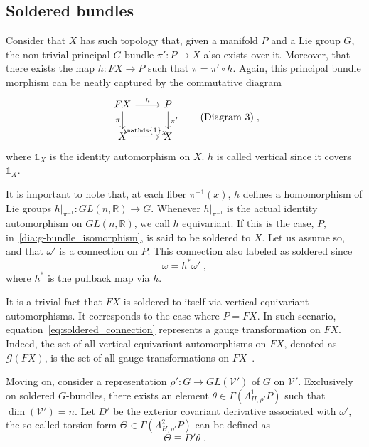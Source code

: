 \documentclass[../../main.tex]{subfiles}
\begin{document}
\subsection{Soldered bundles}\label{ssec:soldered_bundles}

Consider that $X$ has such topology that, given a manifold $P$ and a Lie group $G$, the non-trivial principal $G$-bundle $\pi': P \rightarrow X$ also exists over it. Moreover, that there exists the map $h: FX \rightarrow P$ such that $\pi=\pi'\circ h$. Again, this principal bundle morphism can be neatly captured by the commutative diagram
\begin{equation}
  \label{dia:g-bundle_isomorphism}
  \begin{tikzcd}
    FX
    \arrow[r,"h"]
    \arrow[d,"\pi" left]
    &
    P
    \arrow[d, "\pi'" ]
    \\
    X
    \arrow[r, "\mathds{1}_X"]
    &
    X
  \end{tikzcd} \tag{Diagram 3} \;,
\end{equation}
where $\mathds{1}_X$ is the identity automorphism on $X$. $h$ is called vertical since it covers $\mathds{1}_X$.

It is important to note that, at each fiber $\pi^{-1}(x)$, $h$ defines a homomorphism of Lie groups $h|_{\pi^{-1}}:GL\left(n,\mathbb{R}\right)\rightarrow G$. Whenever $h|_{\pi^{-1}}$ is the actual identity automorphism on $GL\left(n,\mathbb{R}\right)$, we call $h$ equivariant. If this is the case, $P$, in~\ref{dia:g-bundle_isomorphism}, is said to be soldered to $X$. Let us assume so, and that $\omega'$ is a connection on $P$. This connection also labeled as soldered since
\begin{equation}
  \label{eq:soldered_connection}
  \omega = h^* \omega' \;,
\end{equation}
where $h^*$ is the pullback map via $h$.

It is a trivial fact that $FX$ is soldered to itself via vertical equivariant automorphisms. It corresponds to the case where $P=FX$. In such scenario, equation~\eqref{eq:soldered_connection} represents a gauge transformation on $FX$. Indeed, the set of all vertical equivariant automorphisms on $FX$, denoted as $\mathcal{G}\left(FX\right)$, is the set of all gauge transformations on $FX$~\cite{bleecker1981, rudolph2017}.

Moving on, consider a representation $\rho': G\rightarrow GL\left(\mathcal{V}'\right)$ of $G$ on $\mathcal{V}'$. Exclusively on soldered $G$-bundles, there exists an element $\theta \in \Gamma \left(\Lambda^1_{H,\rho'}P\right)$ such that $\dim \left(\mathcal{V}'\right)=n$. Let $D'$ be the exterior covariant derivative associated with $\omega'$, the so-called torsion form $\Theta \in \Gamma \left(\Lambda^2_{H,\rho'}P\right)$ can be defined as
\begin{equation}
  \label{eq:torsion_form}
  \Theta\equiv D'\theta \;.
\end{equation}
\end{document}
